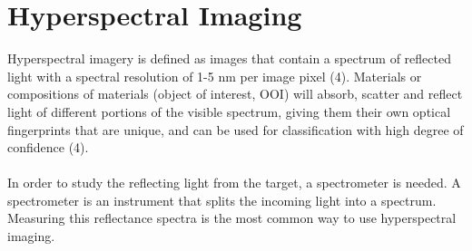\vspace{1.3cm}
\section{Hyperspectral Imaging}
Hyperspectral imagery is defined as images that contain a spectrum of reflected light with a spectral resolution of 1-5 nm per image pixel (4). Materials or compositions of materials (object of interest, OOI) will absorb, scatter and reflect light of different portions of the visible spectrum, giving them their own optical fingerprints that are unique, and can be used for classification with high degree of confidence (4). 
\\\\
In order to study the reflecting light from the target, a spectrometer is needed. A spectrometer is an instrument that splits the incoming light into a spectrum. Measuring this reflectance spectra is the most common way to use hyperspectral imaging.


